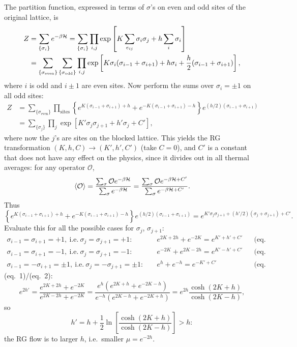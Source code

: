 The partition function, expressed in terms of $\sigma$'s on even and odd sites of the original lattice, is
\begin{align}
  Z &= \sum_{\{\sigma_i\}}e^{-\beta\mathcal{H}}
     = \sum_{\{\sigma_i\}}\prod_{i,j}\exp\left[K\sum_{e_{ij}}\sigma_i\sigma_j + h\sum_i\sigma_i\right]\nonumber\\
    &= \sum_{\{\sigma_{\text{even}}\}}\sum_{\{\sigma_{\text{odd}}\}}\prod_{i,j}
       \exp\left[K\sigma_i(\sigma_{i-1}+\sigma_{i+1}) + h\sigma_i + \frac{h}{2}(\sigma_{i-1}+\sigma_{i+1})\right],
\end{align}
where $i$ is odd and $i\pm1$ are even sites. Now perform the sums over $\sigma_i = \pm1$ on all odd sites:
\begin{align}
  Z &= \sum_{\{\sigma_{\text{even}}\}}\prod_{\text{sites}}\left\{e^{K(\sigma_{i-1}+\sigma_{i+1})+h}
       + e^{-K(\sigma_{i-1}+\sigma_{i+1})-h}\right\}e^{(h/2)(\sigma_{i-1}+\sigma_{i+1})}\nonumber\\
    &= \sum_{\{\sigma_j\}}\prod_j\exp\left[K'\sigma_j\sigma_{j+1} + h'\sigma_j + C'\right],
\end{align}
where now the $j$'s are sites on the blocked lattice. This yields the RG transformation
$(K,h,C)\to(K',h',C')$ (take $C = 0$), and $C'$ is a constant that does not have any effect on the physics,
since it divides out in all thermal averages: for any operator $\mathcal O$,
\begin{equation}
  \langle \mathcal O\rangle = \frac{\sum_\sigma\mathcal Oe^{-\beta\mathcal{H}}}{\sum_\sigma e^{-\beta\mathcal{H}}}
  = \frac{\sum_\sigma\mathcal Oe^{-\beta\mathcal{H}+C'}}{\sum_\sigma e^{-\beta\mathcal{H}+C'}}.
\end{equation}
Thus
\begin{equation}
  \left\{e^{K(\sigma_{i-1}+\sigma_{i+1})+h} + e^{-K(\sigma_{i-1}+\sigma_{i+1})-h}\right\}e^{(h/2)(\sigma_{i-1}+\sigma_{i+1})}
  = e^{K'\sigma_j\sigma_{j+1} + (h'/2)(\sigma_j+\sigma_{j+1}) + C'} .
\end{equation}
Evaluate this for all the possible cases for $\sigma_j$, $\sigma_{j+1}$:
\begin{align}
  \sigma_{i-1} = \sigma_{i+1} = +1,\ \text{i.e.}\ \sigma_j = \sigma_{j+1} = +1:&\quad
    e^{2K+2h} + e^{-2K} = e^{K'+h'+C'} && \text{(eq.\ 1)}\\
  \sigma_{i-1} = \sigma_{i+1} = -1,\ \text{i.e.}\ \sigma_j = \sigma_{j+1} = -1:&\quad
    e^{-2K} + e^{2K-2h} = e^{K'-h'+C'} && \text{(eq.\ 2)}\\
  \sigma_{i-1} = -\sigma_{i+1} = \pm1,\ \text{i.e.}\ \sigma_j = -\sigma_{j+1} = \pm1:&\quad
    e^h + e^{-h} = e^{-K'+C'} && \text{(eq.\ 3)}
\end{align}
(eq.~1)/(eq.~2):
\begin{equation}
  e^{2h'} = \frac{e^{2K+2h}+e^{-2K}}{e^{2K-2h}+e^{-2K}}
  = \frac{e^h(e^{2K+h}+e^{-2K-h})}{e^{-h}(e^{2K-h}+e^{-2K+h})}
  = e^{2h}\frac{\cosh(2K+h)}{\cosh(2K-h)},
\end{equation}
so
\begin{equation}
  h' = h + \frac{1}{2}\ln\left[\frac{\cosh(2K+h)}{\cosh(2K-h)}\right]>h:
\end{equation}
the RG flow is to larger $h$, i.e.\ smaller $\mu = e^{-2h}$.

